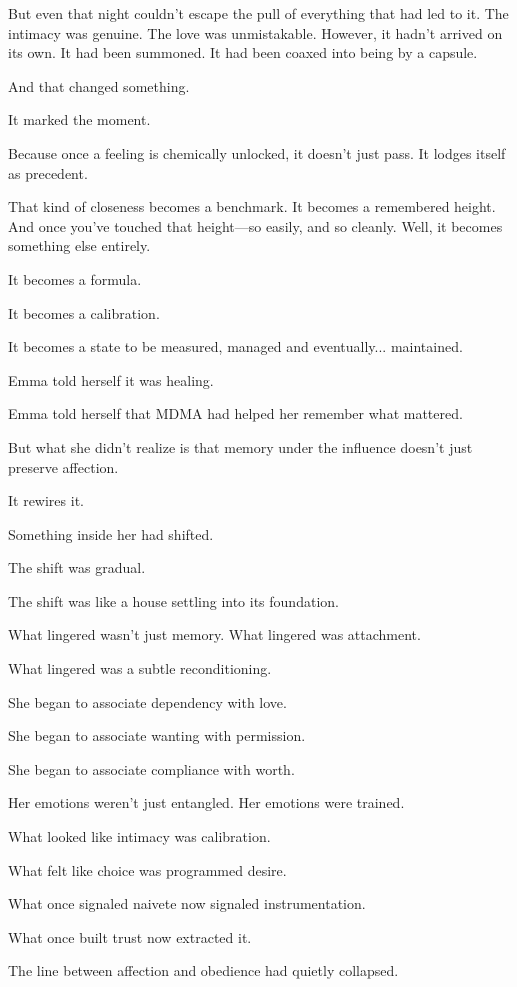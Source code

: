 But even that night couldn't 
escape the pull of everything that had led to it. The intimacy was genuine. The love was unmistakable. 
However, it hadn’t arrived on its own. It had been summoned. It had been coaxed into being by a capsule.

And that changed something.

It marked the moment.

Because once a feeling is chemically unlocked, it doesn’t just pass.
It lodges itself as precedent.

That kind of closeness becomes a benchmark. It becomes a remembered height.
And once you've touched that height—so easily, and so cleanly. Well, it becomes something else entirely.

It becomes a formula.

It becomes a calibration.

It becomes a state to be measured, managed and eventually... maintained.

Emma told herself it was healing. 

Emma told herself that MDMA had helped her remember what mattered.

But what she didn’t realize is that memory under the influence 
doesn't just preserve affection.

It rewires it.

Something inside her had shifted. 

The shift was gradual. 

The shift was like a house settling into its foundation. 

What lingered wasn’t just memory. 
What lingered was attachment. 

What lingered was a subtle reconditioning. 

She began to associate dependency with love. 

She began to associate wanting with permission.

She began to associate compliance with worth.

Her emotions weren’t just entangled. 
Her emotions were trained.

What looked like intimacy was calibration.

What felt like choice was programmed desire.

What once signaled naivete now signaled instrumentation.

What once built trust now extracted it.

The line between affection and obedience had quietly collapsed.

